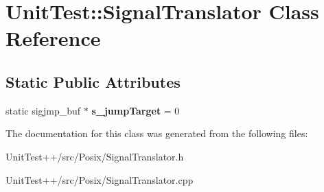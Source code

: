 \hypertarget{classUnitTest_1_1SignalTranslator}{\section{Unit\-Test\-:\-:Signal\-Translator Class Reference}
\label{classUnitTest_1_1SignalTranslator}
}
\subsection*{Static Public Attributes}
\begin{DoxyCompactItemize}
\item 
\hypertarget{classUnitTest_1_1SignalTranslator_afdcc5c84c54af8d28205b03769b4b1c1}{static sigjmp\-\_\-buf $\ast$ {\bfseries s\-\_\-jump\-Target} = 0}\label{classUnitTest_1_1SignalTranslator_afdcc5c84c54af8d28205b03769b4b1c1}

\end{DoxyCompactItemize}


The documentation for this class was generated from the following files\-:\begin{DoxyCompactItemize}
\item 
Unit\-Test++/src/\-Posix/Signal\-Translator.\-h\item 
Unit\-Test++/src/\-Posix/Signal\-Translator.\-cpp\end{DoxyCompactItemize}
